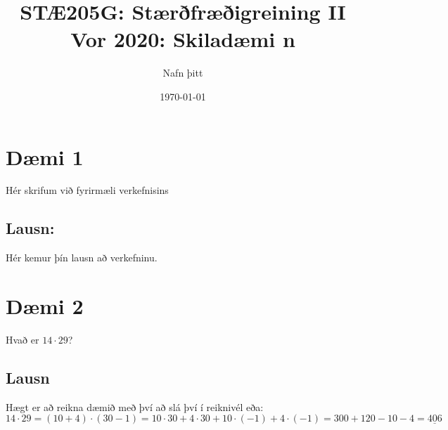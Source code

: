 \documentclass[a4paper]{article}
\author{Nafn þitt} %
\title{STÆ205G: Stærðfræðigreining II \\ Vor 2020: Skiladæmi n}
\date{\today}
\begin{document}
\maketitle
\section*{Dæmi 1}
Hér skrifum við fyrirmæli verkefnisins

\subsection*{Lausn:}
Hér kemur þín lausn að verkefninu.

\section*{Dæmi 2}
Hvað er $14\cdot 29$?

\subsection*{Lausn}
Hægt er að reikna dæmið með því að slá því í reiknivél eða:
$$14 \cdot 29 = (10+4)\cdot(30-1)=10\cdot 30 +4\cdot 30 +10\cdot(-1)+4\cdot(-1) = 300+120-10-4= \underline{406} $$
\end{document}
